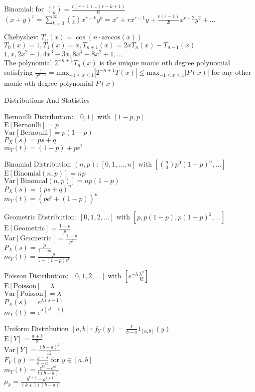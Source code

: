 Binomial: for $\binom{r}{k}=\frac{r(r-1)\dots (r-k+1)}{k!}$ \\
$(x+y)^r=\sum_{k=0}^{\infty}\binom{r}{k}x^{r-k}y^k=x^r+rx^{r-1}y+\frac{r(r-1)}{2!}x^{r-2}y^2+\dots$

Chebyshev: $T_n (x)=\cos(n\cdot \text{arccos}(x))$ \\
$T_0 (x)=1,T_1(x)=x,T_{n+1}(x)=2xT_n(x)-T_{n-1}(x)$ \\
$1,x,2x^2-1,4x^3-3x,8x^4-8x^2+1,\dots$ \\
The polynomial $2^{-n+1}T_n(x)$ is the unique monic $n$th degree polynomial satisfying $\frac{1}{2^{n-1}} = \text{max}_{-1 \le x \le 1}|2^{-n+1}T(x)| \le \text{max}_{-1 \le x \le 1}|P(x)|$ for any other monic $n$th degree polynomial $P(x)$

Distributions And Statistics

Bernoulli Distribution: $[0,1]$ with $[1-p,p]$ \\
$\text{E}[\text{Bernoulli}]=p$ \\
$\text{Var}[\text{Bernoulli}]=p(1-p)$ \\
$P_X(s)=ps+q$ \\
$m_Y(t)=(1-p)+pe^t$

Binomial Distribution $(n,p)$: $[0,1,\dots,n]$ with $[\binom{n}{0}p^0(1-p)^n,\dots]$ \\
$\text{E}[\text{Binomial}(n,p)]=np$ \\
$\text{Var}[\text{Binomial}(n,p)]=np(1-p)$ \\
$P_X(s)=(ps+q)^n$ \\
$m_Y(t)=(pe^t+(1-p))^n$

Geometric Distribution: $[0,1,2,\dots]$ with $[p,p(1-p),p(1-p)^2,\dots]$ \\
$\text{E}[\text{Geometric}]=\frac{1-p}{p}$ \\
$\text{Var}[\text{Geometric}]=\frac{1-p}{p^2}$ \\
$P_X(s)=\frac{p}{1-qs}$ \\
$m_Y(t)=\frac{p}{1-(1-p)e^t}$

Poisson Distribution: $[0,1,2,\dots]$ with $[e^{-\lambda}\frac{\lambda^k}{k!}]$ \\
$\text{E}[\text{Poisson}]=\lambda$ \\
$\text{Var}[\text{Poisson}]=\lambda$ \\
$P_X(s)=e^{\lambda(s-1)}$ \\
$m_Y(t)=e^{\lambda (e^t-1)}$

Uniform Distribution $[a,b]$: $f_Y(y)=\frac{1}{b-a}1_{[a,b]}(y)$ \\
$\text{E}[Y]=\frac{a+b}{2}$ \\
$\text{Var}[Y]=\frac{(b-a)^2}{12}$ \\
$F_Y(y)=\frac{y-a}{b-a}$ for $y\in [a,b]$ \\
$m_Y(t)=\frac{e^{bt}-e^{at}}{t(b-a)}$ \\
$\mu_k=\frac{b^{k+1}-a^{k+1}}{(k+1)(b-a)}$

